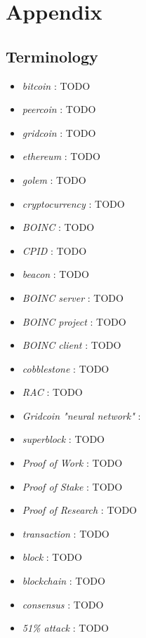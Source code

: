 \section{Appendix}

\subsection{Terminology}

\begin{itemize}
  \item \textit{bitcoin} : TODO
  \item \textit{peercoin} : TODO
  \item \textit{gridcoin} : TODO
  \item \textit{ethereum} : TODO
  \item \textit{golem} : TODO
  \item \textit{cryptocurrency} : TODO
  \item \textit{BOINC} : TODO
  \item \textit{CPID} : TODO
  \item \textit{beacon} : TODO
  \item \textit{BOINC server} : TODO
  \item \textit{BOINC project} : TODO
  \item \textit{BOINC client} : TODO
  \item \textit{cobblestone} : TODO
  \item \textit{RAC} : TODO
  \item \textit{Gridcoin "neural network"} : 
  \item \textit{superblock} : TODO
  \item \textit{Proof of Work} : TODO
  \item \textit{Proof of Stake} : TODO
  \item \textit{Proof of Research} : TODO
  \item \textit{transaction} : TODO
  \item \textit{block} : TODO
  \item \textit{blockchain} : TODO
  \item \textit{consensus} : TODO
  \item \textit{51\% attack} : TODO
  
\end{itemize}
